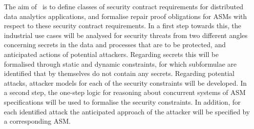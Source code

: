 \begin{Workpackage}{\thewpno}
\begin{Task}
\TaskResults{%
\ref{del:formal1},
\ref{del:formal2},
\ref{del:formal3}
}
\TaskHeader{}

The aim of \theTask\ is to define classes of security contract requirements for distributed data analytics applications, and formalise repair proof obligations for ASMs with respect to these security contract requirements. In a first step towards this, the industrial use cases will be analysed for security threats from two different angles concerning secrets in the data and processes that are to be protected, and anticipated actions of potential attackers. Regarding secrets this will be formalised through static and dynamic constraints, for which subformulae are identified that by themselves do not contain any secrets. Regarding potential attacks, attacker models for each of the security constraints will be developed. In a second step, the one-step logic for reasoning about concurrent systems of ASM specifications will be used to formalise the security constraints. In addition, for each identified attack the anticipated approach of the attacker will be specified by a corresponding ASM.
\end{Task}


%
%



\begin{Task}

\TaskResults{%
\ref{del:formal1},
\ref{del:formal2},
\ref{del:formal3}
}
\TaskHeader{}


\end{Task}
\end{Workpackage}
